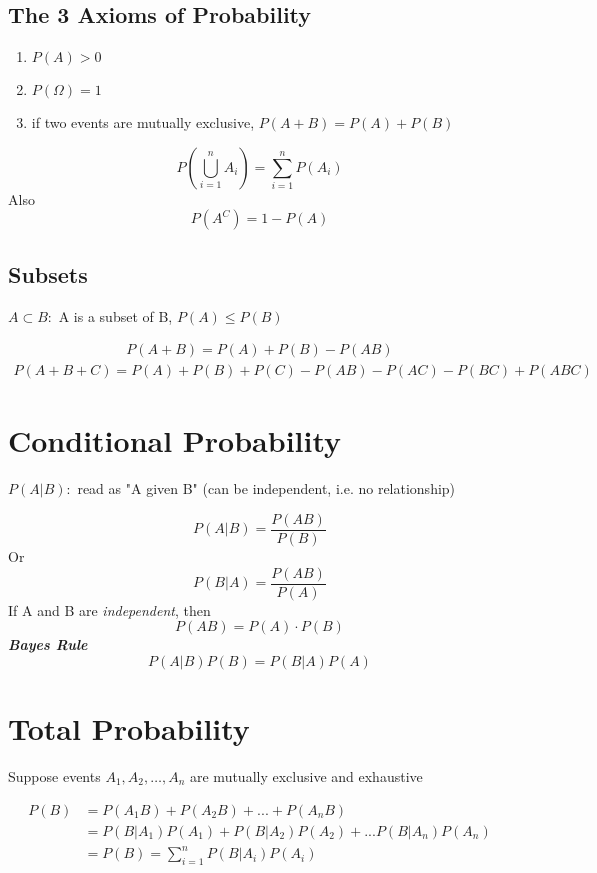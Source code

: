\documentclass[12pt]{article}
\begin{document}
    \subsection{The 3 Axioms of Probability}

    \begin{enumerate}[label=\Roman*]
        \item $P(A) > 0$
        \item $P(\Omega) = 1$
        \item if two events are mutually exclusive, 
        $ P(A+B) = P(A) + P(B) $
    \end{enumerate}

    $$P(\bigcup_{i=1}^{n} A_i) = \sum_{i=1}^{n} P(A_i)$$
    Also
    $$P(A^C) = 1 - P(A)$$

    \subsection{Subsets}

    $A \subset B:$ A is a subset of B, $P(A) \leq P(B)$
    
    \begin{align}
        P(A+B) = P(A) + P(B) - P(AB)
    \end{align} 
    \begin{align}
        P(A+B+C) = P(A) + P(B) + P(C) - P(AB) - P(AC) - P(BC) + P(ABC)
    \end{align}

    \section{Conditional Probability}

    $P(A|B):$ read as "A given B" (can be independent, i.e. no relationship)

    $$P(A|B) = \frac{P(AB)}{P(B)}$$ 
    Or
    $$P(B|A) = \frac{P(AB)}{P(A)}$$
    If A and B are \textit{independent}, then
    $$P(AB) = P(A) \cdot P(B)$$
    \textbf{\textit{Bayes Rule}}
    $$P(A|B)P(B) = P(B|A)P(A)$$

    \section{Total Probability}

    Suppose events $A_1, A_2,\dots,A_n$ are mutually exclusive and exhaustive
    
    \begin{center}
    \end{center}
    \begin{align*}
        P(B) &= P(A_1B) + P(A_2B) + ... + P(A_nB) \\
             &= P(B|A_1)P(A_1) + P(B|A_2)P(A_2) + ... P(B|A_n)P(A_n) \\
             &= P(B) =  \sum_{i=1}^{n} P(B|A_i)P(A_i)
    \end{align*}
\end{document}
